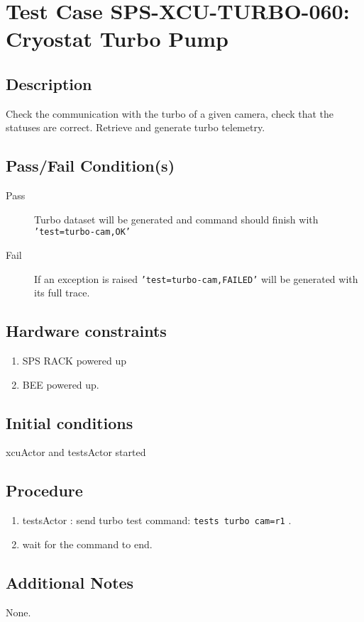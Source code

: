 \section{Test Case SPS-XCU-TURBO-060: Cryostat Turbo Pump}

\subsection{Description}

Check the communication with the turbo of a given camera, check that the statuses are correct.
Retrieve and generate turbo telemetry.

\subsection{Pass/Fail Condition(s)}

\begin{description}
\item [Pass] Turbo dataset will be generated and command should finish with \texttt{'test=turbo-cam,OK'}
\item [Fail] If an exception is raised \texttt{'test=turbo-cam,FAILED'} will be generated with its full trace.

\end{description}

\subsection{Hardware constraints}

\begin{enumerate}
    \item SPS RACK powered up
    \item BEE powered up.
\end{enumerate}

\subsection{Initial conditions}

xcuActor and testsActor started

\subsection{Procedure}

\begin{enumerate}
    \item testsActor : send turbo test command: \texttt{tests turbo cam=r1} .
    \item wait for the command to end.
\end{enumerate}

\subsection{Additional Notes}
None.
